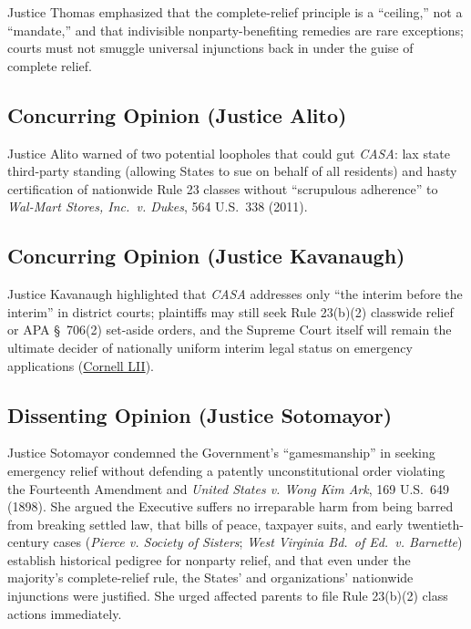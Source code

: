 \documentclass[12pt]{article}
\begin{document}
Justice Thomas emphasized that the complete-relief principle is a ``ceiling,'' not a ``mandate,'' and that indivisible nonparty-benefiting remedies are rare exceptions; courts must not smuggle universal injunctions back in under the guise of complete relief.

\subsection{Concurring Opinion (Justice Alito)}

Justice Alito warned of two potential loopholes that could gut \textit{CASA}: lax state third-party standing (allowing States to sue on behalf of all residents) and hasty certification of nationwide Rule 23 classes without ``scrupulous adherence'' to \textit{Wal-Mart Stores, Inc.\ v. Dukes}, 564 U.S.\ 338 (2011).

\subsection{Concurring Opinion (Justice Kavanaugh)}

Justice Kavanaugh highlighted that \textit{CASA} addresses only ``the interim before the interim'' in district courts; plaintiffs may still seek Rule 23(b)(2) classwide relief or APA \S\ 706(2) set-aside orders, and the Supreme Court itself will remain the ultimate decider of nationally uniform interim legal status on emergency applications (\href{https://www.law.cornell.edu/supremecourt/text/24A884}{Cornell LII}).

\subsection{Dissenting Opinion (Justice Sotomayor)}

Justice Sotomayor condemned the Government's ``gamesmanship'' in seeking emergency relief without defending a patently unconstitutional order violating the Fourteenth Amendment and \textit{United States v. Wong Kim Ark}, 169 U.S.\ 649 (1898). She argued the Executive suffers no irreparable harm from being barred from breaking settled law, that bills of peace, taxpayer suits, and early twentieth-century cases (\textit{Pierce v. Society of Sisters}; \textit{West Virginia Bd.\ of Ed.\ v. Barnette}) establish historical pedigree for nonparty relief, and that even under the majority's complete-relief rule, the States' and organizations' nationwide injunctions were justified. She urged affected parents to file Rule 23(b)(2) class actions immediately.
\end{document}
